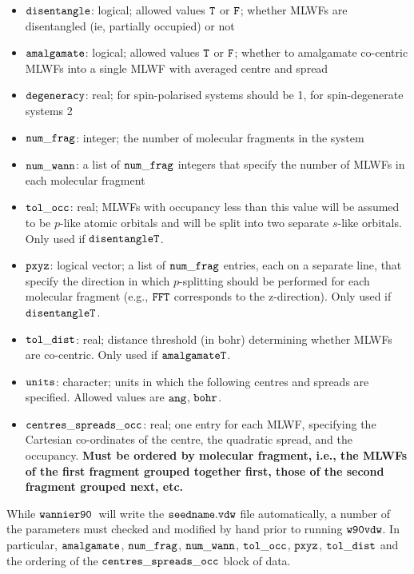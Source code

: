 \documentclass{report}
\newcommand{\wvdw}{{$\tt{w90vdw}$}}
\newcommand{\wannier}{{$\tt{wannier90}$}}
\begin{document}
\begin{itemize}
\item $\tt{disentangle}$: logical; allowed values $\tt{T}$ or
  $\tt{F}$; whether MLWFs are disentangled (ie, partially occupied) or
  not
\item $\tt{amalgamate}$: logical; allowed values $\tt{T}$ or
  $\tt{F}$; whether to amalgamate co-centric MLWFs into a single MLWF
  with averaged centre and spread 
\item $\tt{degeneracy}$: real; for spin-polarised systems should be 1,
  for spin-degenerate systems 2
\item $\tt{num\_frag}$: integer; the number of molecular fragments in
    the system
\item $\tt{num\_wann}$: a list of $\tt{num\_frag}$ integers that
  specify the number of MLWFs in each molecular fragment
\item $\tt{tol\_occ}$: real; MLWFs with occupancy less than this value
  will be assumed to be $p$-like atomic orbitals and will be split
  into two separate $s$-like orbitals. Only used if $\tt{disentangle
    T}$. 
\item $\tt{pxyz}$: logical vector; a list of $\tt{num\_frag}$ entries,
  each on a separate line, that specify the direction in which
  $p$-splitting should be performed for each molecular fragment (e.g.,
  $\tt{F F T}$ corresponds to the z-direction). Only used if $\tt{disentangle
    T}$.
\item $\tt{tol\_dist}$: real; distance threshold (in bohr) determining whether
  MLWFs are co-centric. Only used if $\tt{amalgamate T}$.
\item $\tt{units}$: character; units in which the following centres
  and spreads are specified. Allowed values are $\tt{ang}$,
  $\tt{bohr}$. 
\item $\tt{centres\_spreads\_occ}$: real; one entry for each MLWF,
  specifying the Cartesian co-ordinates of the centre, the quadratic
  spread, and the occupancy. \textbf{Must be ordered by molecular
    fragment, i.e., the MLWFs of the first fragment grouped together
    first, those of the second fragment grouped next, etc.}
\end{itemize}

While \wannier\ will write the $\tt{seedname.vdw}$ file
automatically, a number of the parameters must checked and modified by hand
prior to running \wvdw. In particular, $\tt{amalgamate}$,
$\tt{num\_frag}$, $\tt{num\_wann}$, $\tt{tol\_occ}$, $\tt{pxyz}$,
  $\tt{tol\_dist}$ and the ordering of the
  $\tt{centres\_spreads\_occ}$ block of data. 
\end{document}
